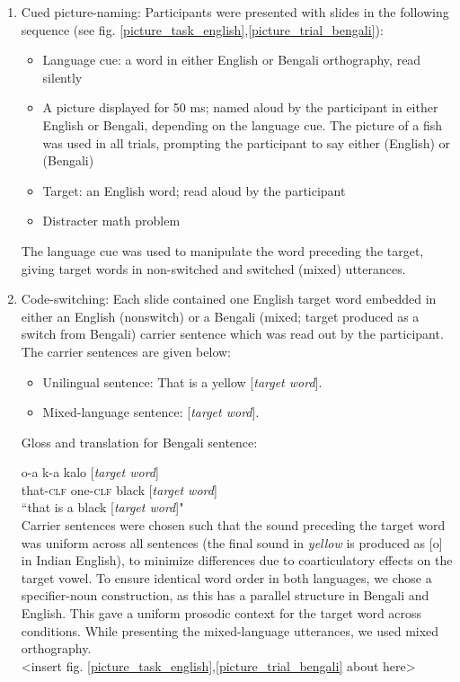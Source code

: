 \documentclass[12 pt]{article}
\newcommand{\nt}[1]{\textipa{[#1]}} %
\begin{document}
\begin{enumerate}[]
	\item Cued picture-naming: Participants were presented with slides in the following sequence (see fig. \ref{picture_task_english},\ref{picture_trial_bengali}):
	\begin{itemize}
		\item Language cue: a word in either English or Bengali orthography, read silently
		\item A picture displayed for 50 ms; named aloud by the participant in either English or Bengali, depending on the language cue. The picture of a fish was used in all trials, prompting the participant to say either \nt{fIS} (English) or \nt{ma: \textteshlig \super{h}} (Bengali)
		\item Target: an English word; read aloud by the participant
		\item Distracter math problem
	\end{itemize}
	The language cue was used to manipulate the word preceding the target, giving target words in non-switched and switched (mixed) utterances. 
	
	\item Code-switching: Each slide contained one English target word embedded in either an English (nonswitch) or a Bengali (mixed; target produced as a switch from Bengali) carrier sentence which was read out by the participant. The carrier sentences are given below:
	\begin{itemize}
		\item Unilingual sentence: That is a yellow [\textit{target word}].
		\item Mixed-language sentence:  [\textit{target word}]. 
	\end{itemize}
	
Gloss and translation for Bengali sentence:

o-a \qquad \textipa{\ae}k-a \quad kalo [\textit{target word}]\\
that-\textsc{clf}  one-\textsc{clf}  black [\textit{target word}]\\
``that is a black [\textit{target word}]"\\
	
Carrier sentences were chosen such that the sound preceding the target word was uniform across all sentences (the final sound in \textit{yellow} is produced as [o] in Indian English), to minimize differences due to coarticulatory effects on the target vowel. To ensure identical word order in both languages, we chose a specifier-noun construction, as this has a parallel structure in Bengali and English. This gave a uniform prosodic context for the target word across conditions. While presenting the mixed-language utterances, we used mixed orthography. \\

<insert fig. \ref{picture_task_english},\ref{picture_trial_bengali} about here>
	
\end{enumerate}
\end{document}
